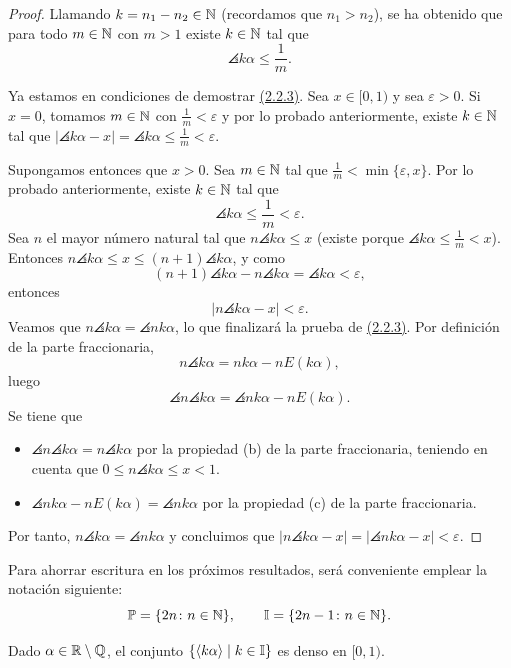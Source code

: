 \documentclass[a4paper, 12pt, oneside]{book}
\begin{document}
\begin{proof}
    Llamando $k = n_1-n_2 \in \mathbb N$ (recordamos que $n_1>n_2$), se ha obtenido que para todo $m \in \mathbb N$ con $m>1$ existe $k \in \mathbb N$ tal que
    \[\angles{k\alpha} \leq \frac{1}{m}.\]
    
    Ya estamos en condiciones de demostrar \hyperref[2.2.3]{\color{blue}(2.2.3)}. Sea $x \in [0,1)$ y sea $\varepsilon > 0$. Si $x = 0$, tomamos $m \in \mathbb N$ con $\frac{1}{m}<\varepsilon$ y por lo probado anteriormente, existe $k \in \mathbb N$ tal que $|\angles{k\alpha}-x| = \angles{k\alpha}  \leq \frac{1}{m}< \varepsilon$.
    
    Supongamos entonces que $x > 0$. Sea $m \in \mathbb N$ tal que $\frac{1}{m} < \min\{\varepsilon,x\}$. Por lo probado anteriormente, existe $k \in \mathbb N$ tal que
    \[\angles{k\alpha} \leq \frac{1}{m}< \varepsilon.\]
    Sea $n$ el mayor número natural tal que $n \angles{k\alpha} \leq x$ (existe porque $\angles{k\alpha} \leq \frac{1}{m} < x$). Entonces $n \angles{k\alpha} \leq x \leq (n+1)\angles{k\alpha}$, y como
    \[(n+1)\angles{k\alpha} - n\angles{k\alpha} = \angles{k\alpha} < \varepsilon,\]
    entonces
    \[|n\angles{k\alpha}-x| < \varepsilon.\]
    Veamos que $n\angles{k\alpha} = \angles{nk\alpha}$, lo que finalizará la prueba de \hyperref[2.2.3]{\color{blue}(2.2.3)}. Por definición de la parte fraccionaria,
    \[n\angles{k\alpha} = nk\alpha-nE( k\alpha ),\]
    luego 
    \[\angles{n\angles{k\alpha}} = \angles{nk\alpha-nE( k\alpha)}.\]
    Se tiene que
    \begin{itemize}
        \item $\angles{n\angles{k\alpha}} = n\angles{k\alpha}$ por la propiedad (b) de la parte fraccionaria, teniendo en cuenta que $0 \leq n\angles{k\alpha} \leq x < 1$.
        \item $\angles{nk\alpha-nE( k\alpha )} = \angles{nk\alpha}$ por la propiedad (c) de la parte fraccionaria.
    \end{itemize}
    Por tanto, $n\angles{k\alpha} = \angles{nk\alpha}$ y concluimos que $|n\angles{k\alpha}-x| = |\angles{nk\alpha}-x|<\varepsilon$.
\end{proof}

Para ahorrar escritura en los próximos resultados, será conveniente emplear la notación siguiente:
\[\mathbb{P} = \{2n \colon n \in \mathbb N\}, \qquad \mathbb I = \{2n-1 \colon n \in \mathbb N\}.\]

\begin{lemma}
    Dado $\alpha \in \mathbb R \setminus \mathbb Q$, el conjunto $\{\langle k\alpha \rangle \mid k \in \mathbb I\}$ es denso en $[0,1)$.
\end{lemma}
\end{document}
